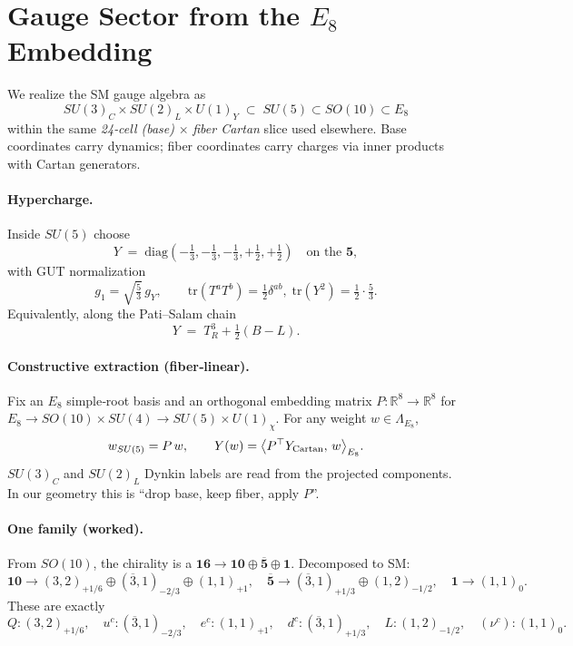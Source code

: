 \section{Gauge Sector from the \texorpdfstring{$E_8$}{E8} Embedding}
\label{sec:gauge-from-e8}

We realize the SM gauge algebra as
\[
SU(3)_C \times SU(2)_L \times U(1)_Y \;\subset\; SU(5)\subset SO(10)\subset E_8
\]
within the same \emph{24‑cell (base)} $\times$ \emph{fiber Cartan} slice used elsewhere.
Base coordinates carry dynamics; fiber coordinates carry charges via inner
products with Cartan generators.

\paragraph{Hypercharge.}
Inside $SU(5)$ choose
\[
Y \;=\; \mathrm{diag}\!\left(-\tfrac13,-\tfrac13,-\tfrac13,+\tfrac12,+\tfrac12\right)
\quad\text{on the } \mathbf{5} ,
\]
with GUT normalization
\[
g_1=\sqrt{\tfrac{5}{3}}\,g_Y, \qquad
\mathrm{tr}(T^aT^b)=\tfrac12\delta^{ab},\; \mathrm{tr}(Y^2)=\tfrac12\!\cdot\!\tfrac{5}{3}.
\]
Equivalently, along the Pati–Salam chain
\[
Y \;=\; T^3_{R} + \tfrac12(B\!-\!L).
\]

\paragraph{Constructive extraction (fiber‑linear).}
Fix an $E_8$ simple‑root basis and an orthogonal embedding matrix
$P:\mathbb R^8\!\to\!\mathbb R^8$ for
$E_8\to SO(10)\times SU(4)\to SU(5)\times U(1)_\chi$.
For any weight $w\in\Lambda_{E_8}$,
\[
w_{SU(5)} = P\,w, \qquad
Y(w) = \big\langle P^\top Y_{\rm Cartan},\, w\big\rangle_{E_8}.
\]
$SU(3)_C$ and $SU(2)_L$ Dynkin labels are read from the projected components.
In our geometry this is “drop base, keep fiber, apply $P$”.

\paragraph{One family (worked).}
From $SO(10)$, the chirality is a $\mathbf{16}\to \mathbf{10}\oplus\overline{\mathbf{5}}\oplus \mathbf{1}$.
Decomposed to SM:
\[
\mathbf{10}\to (3,2)_{+1/6}\oplus(\overline3,1)_{-2/3}\oplus(1,1)_{+1},\quad
\overline{\mathbf{5}}\to (\overline3,1)_{+1/3}\oplus(1,2)_{-1/2},\quad
\mathbf{1}\to (1,1)_0.
\]
These are exactly
\[
Q:(3,2)_{+1/6},\quad
u^c:(\overline3,1)_{-2/3},\quad
e^c:(1,1)_{+1},\quad
d^c:(\overline3,1)_{+1/3},\quad
L:(1,2)_{-1/2},\quad
(\nu^c):(1,1)_0 .
\]

